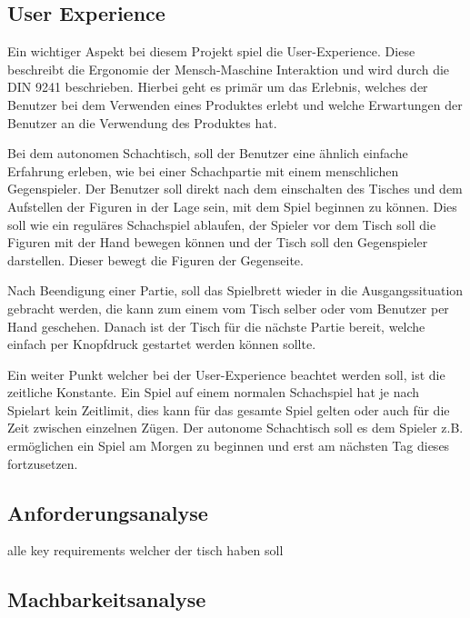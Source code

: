 \hypertarget{user-experience}{%
\subsection{User Experience}\label{user-experience}}

Ein wichtiger Aspekt bei diesem Projekt spiel die User-Experience. Diese
beschreibt die Ergonomie der Mensch-Maschine Interaktion und wird durch
die DIN 9241\autocite{din9241} beschrieben. Hierbei geht es primär um
das Erlebnis, welches der Benutzer bei dem Verwenden eines Produktes
erlebt und welche Erwartungen der Benutzer an die Verwendung des
Produktes hat.

Bei dem autonomen Schachtisch, soll der Benutzer eine ähnlich einfache
Erfahrung erleben, wie bei einer Schachpartie mit einem menschlichen
Gegenspieler. Der Benutzer soll direkt nach dem einschalten des Tisches
und dem Aufstellen der Figuren in der Lage sein, mit dem Spiel beginnen
zu können. Dies soll wie ein reguläres Schachspiel ablaufen, der Spieler
vor dem Tisch soll die Figuren mit der Hand bewegen können und der Tisch
soll den Gegenspieler darstellen. Dieser bewegt die Figuren der
Gegenseite.

Nach Beendigung einer Partie, soll das Spielbrett wieder in die
Ausgangssituation gebracht werden, die kann zum einem vom Tisch selber
oder vom Benutzer per Hand geschehen. Danach ist der Tisch für die
nächste Partie bereit, welche einfach per Knopfdruck gestartet werden
können sollte.

Ein weiter Punkt welcher bei der User-Experience beachtet werden soll,
ist die zeitliche Konstante. Ein Spiel auf einem normalen Schachspiel
hat je nach Spielart kein Zeitlimit, dies kann für das gesamte Spiel
gelten oder auch für die Zeit zwischen einzelnen Zügen. Der autonome
Schachtisch soll es dem Spieler z.B. ermöglichen ein Spiel am Morgen zu
beginnen und erst am nächsten Tag dieses fortzusetzen.

\hypertarget{anforderungsanalyse}{%
\subsection{Anforderungsanalyse}\label{anforderungsanalyse}}

alle key requirements welcher der tisch haben soll

\hypertarget{machbarkeitsanalyse}{%
\subsection{Machbarkeitsanalyse}\label{machbarkeitsanalyse}}

